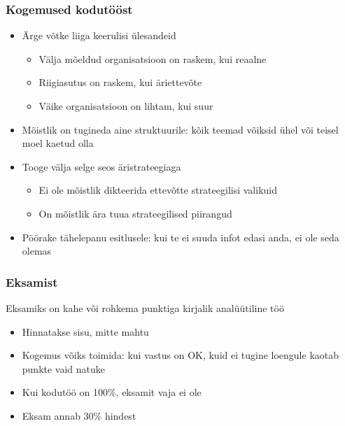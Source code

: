 \begin{frame}[fragile]
  \frametitle{Kogemused kodutööst}
  	\begin{itemize}
		\item Ärge võtke liiga keerulisi ülesandeid
		\begin{itemize}
			\item Välja mõeldud organisatsioon on raskem, kui reaalne
			\item Riigiasutus on raskem, kui äriettevõte
			\item Väike organisatsioon on lihtam, kui suur
		\end{itemize}
		\item Mõistlik on tugineda aine struktuurile: kõik teemad võiksid ühel või teisel moel kaetud olla
		\item Tooge välja selge seos äristrateegiaga
		\begin{itemize}
			\item Ei ole mõistlik dikteerida ettevõtte strateegilisi valikuid
			\item On mõistlik ära tuua strateegilised piirangud
		\end{itemize}
		\item Pöörake tähelepanu esitlusele: kui te ei suuda infot edasi anda, ei ole seda olemas
	\end{itemize}
\end{frame}


\begin{frame}[fragile]
  \frametitle{Eksamist}
  Eksamiks on kahe või rohkema punktiga kirjalik analüütiline töö
  	\begin{itemize}
		\item Hinnatakse sisu, mitte mahtu
		\item Kogemus võiks toimida: kui vastus on OK, kuid ei tugine loengule kaotab punkte vaid natuke
		\item Kui kodutöö on 100\%, eksamit vaja ei ole
		\item Eksam annab 30\% hindest
	\end{itemize}
\end{frame}

